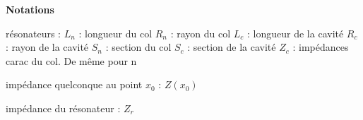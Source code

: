 \textbf{Notations}

résonateurs : 
$L_{n}$ : longueur du col
$R_{n}$ : rayon du col
$L_{c}$ : longueur de la cavité
$R_{c}$ : rayon de la cavité
$S_{n}$ : section du col
$S_{c}$ : section de la cavité
$Z_{c}$ : impédances carac du col. De même pour n

impédance quelconque au point $x_{0}$ : $Z(x_{0})$

impédance du résonateur : $Z_{r}$


